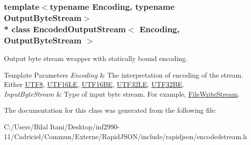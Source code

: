 \subsubsection*{template$<$typename Encoding, typename Output\+Byte\+Stream$>$\\*
class Encoded\+Output\+Stream$<$ Encoding, Output\+Byte\+Stream $>$}

Output byte stream wrapper with statically bound encoding. 


\begin{DoxyTemplParams}{Template Parameters}
{\em Encoding} & The interpretation of encoding of the stream. Either \hyperlink{struct_u_t_f8}{U\+T\+F8}, \hyperlink{struct_u_t_f16_l_e}{U\+T\+F16\+LE}, \hyperlink{struct_u_t_f16_b_e}{U\+T\+F16\+BE}, \hyperlink{struct_u_t_f32_l_e}{U\+T\+F32\+LE}, \hyperlink{struct_u_t_f32_b_e}{U\+T\+F32\+BE}. \\
\hline
{\em Input\+Byte\+Stream} & Type of input byte stream. For example, \hyperlink{class_file_write_stream}{File\+Write\+Stream}. \\
\hline
\end{DoxyTemplParams}


The documentation for this class was generated from the following file\+:\begin{DoxyCompactItemize}
\item 
C\+:/\+Users/\+Bilal Itani/\+Desktop/inf2990-\/11/\+Cadriciel/\+Commun/\+Externe/\+Rapid\+J\+S\+O\+N/include/rapidjson/encodedstream.\+h\end{DoxyCompactItemize}
